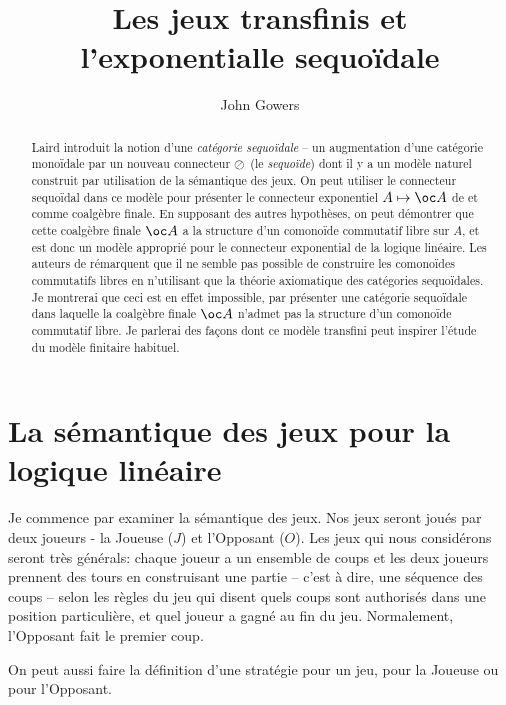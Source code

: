 \documentclass[11pt]{article}
\title{Les jeux transfinis et l'exponentialle sequo\"{i}dale}
\author{John Gowers}
\begin{document}
\maketitle

\begin{abstract}
  Laird \cite{laird02} introduit la notion d'une \emph{cat\'{e}gorie sequo\"{i}dale} -- un augmentation d'une cat\'{e}gorie mono\"{i}dale par un nouveau connecteur $\oslash$ (le \emph{sequo\"{i}de}) dont il y a un mod\`{e}le naturel construit par utilisation de la s\'{e}mantique des jeux.  On peut utiliser le connecteur sequo\"{i}dal dans ce mod\`{e}le pour pr\'{e}senter le connecteur exponentiel $A\mapsto\oc A$ de \cite{hyland1997games} et \cite{ajmPcf} comme coalg\`{e}bre finale.  En supposant des autres hypoth\`{e}ses, on peut d\'{e}montrer que cette coalg\`{e}bre finale $\oc A$ a la structure d'un comono\"{i}de commutatif libre sur $A$, et est donc un mod\`{e}le appropri\'{e} pour le connecteur exponential de la logique lin\'{e}aire.  Les auteurs de \cite{martinsthesis} r\'{e}marquent que il ne semble pas possible de construire les comono\"{i}des commutatifs libres en n'utilisant que la th\'{e}orie axiomatique des cat\'{e}gories sequo\"{i}dales.  Je montrerai que ceci est en effet impossible, par pr\'{e}senter une cat\'{e}gorie sequo\"{i}dale dans laquelle la coalg\`{e}bre finale $\oc A$ n'admet pas la structure d'un comono\"{i}de commutatif libre.  Je parlerai des fa\c{c}ons dont ce mod\`{e}le transfini peut inspirer l'\'{e}tude du mod\`{e}le finitaire habituel.
\end{abstract}

\section{La s\'{e}mantique des jeux pour la logique lin\'{e}aire}

Je commence par examiner la s\'{e}mantique des jeux.  Nos jeux seront jou\'{e}s par deux joueurs - la Joueuse ($J$) et l'Opposant ($O$).  Les jeux qui nous consid\'{e}rons seront tr\`{e}s g\'{e}n\'{e}rals: chaque joueur a un ensemble de coups et les deux joueurs prennent des tours en construisant une partie -- c'est \`{a} dire, une s\'{e}quence des coups -- selon les r\`{e}gles du jeu qui disent quels coups sont authoris\'{e}s dans une position particuli\`{e}re, et quel joueur a gagn\'{e} au fin du jeu.  Normalement, l'Opposant fait le premier coup.

On peut aussi faire la d\'{e}finition d'une strat\'{e}gie pour un jeu, pour la Joueuse ou pour l'Opposant.  
\end{document}
